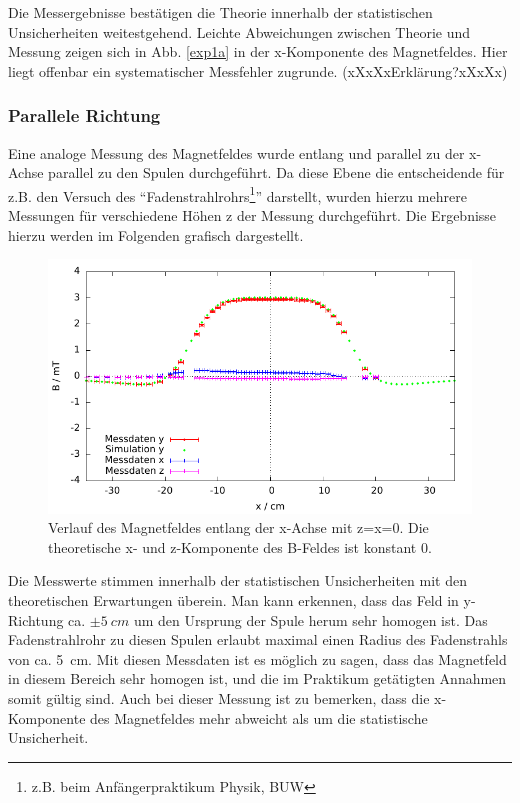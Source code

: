 \documentclass[12pt,a4paper]{article}
\begin{document}
Die Messergebnisse bestätigen die Theorie innerhalb der statistischen Unsicherheiten weitestgehend. Leichte Abweichungen zwischen Theorie und Messung zeigen sich in Abb. \ref{exp1a} in der x-Komponente des Magnetfeldes. Hier liegt offenbar ein systematischer Messfehler zugrunde. (xXxXxErklärung?xXxXx)
\subsubsection*{Parallele Richtung}
Eine analoge Messung des Magnetfeldes wurde entlang und parallel zu der x-Achse parallel zu den Spulen durchgeführt. Da diese Ebene die entscheidende für z.B. den Versuch des "`Fadenstrahlrohrs\footnote{z.B. beim Anfängerpraktikum Physik, BUW}"' darstellt, wurden hierzu mehrere Messungen für verschiedene Höhen z der Messung durchgeführt. Die Ergebnisse hierzu werden im Folgenden grafisch dargestellt.
\begin{figure}[H]
	\centering
	\includegraphics[scale=1.1]{abs1_Auswertung_parallel_1.pdf}
	\caption{Verlauf des Magnetfeldes entlang der x-Achse mit z=x=0. Die theoretische x- und z-Komponente des B-Feldes ist konstant 0.}
	\label{fit:par1}
\end{figure}
Die Messwerte stimmen innerhalb der statistischen Unsicherheiten mit den theoretischen Erwartungen überein. Man kann erkennen, dass das Feld in y-Richtung ca. $\pm \SI{5}{cm}$ um den Ursprung der Spule herum sehr homogen ist. Das Fadenstrahlrohr zu diesen Spulen erlaubt maximal einen Radius des Fadenstrahls von ca. \SI{5}{cm}. Mit diesen Messdaten ist es möglich zu sagen, dass das Magnetfeld in diesem Bereich sehr homogen ist, und die im Praktikum getätigten Annahmen somit gültig sind. Auch bei dieser Messung ist zu bemerken, dass die x-Komponente des Magnetfeldes mehr abweicht als um die statistische Unsicherheit.\\
\end{document}
